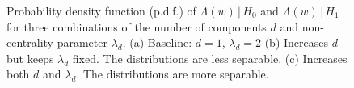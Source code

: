\begin{figure}[t]
\centering
{}
\caption{Probability density function (p.d.f.) of $\Lambda(w)\,|\,H_0$ and
  $\Lambda(w)\,|\,H_1$ for three combinations of the number of components $d$ and
  non-centrality parameter $\lambda_d$. (a) Baseline: $d=1$, $\lambda_d=2$ (b) Increases $d$
  but keeps $\lambda_d$ fixed. The distributions are less separable. (c) Increases both $d$
  and $\lambda_d$. The distributions are more separable.}
\label{fig:distributions}
\end{figure}

